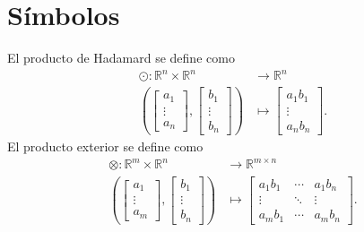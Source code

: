\chapter{Símbolos}

El producto de Hadamard se define como
\begin{align*}
	\odot\colon\mathbb{R}^{n}\times\mathbb{R}^{n} & \longrightarrow\mathbb{R}^{n} \\
	\left(
	\begin{bmatrix}
			a_{1}  \\
			\vdots \\
			a_{n}
		\end{bmatrix},
	\begin{bmatrix}
			b_{1}  \\
			\vdots \\
			b_{n}
		\end{bmatrix}
	\right)                                       & \longmapsto
	\begin{bmatrix}
		a_{1}b_{1} \\
		\vdots     \\
		a_{n}b_{n}
	\end{bmatrix}.
\end{align*}
El producto exterior se define como
\begin{align*}
	\otimes\colon\mathbb{R}^{m}\times\mathbb{R}^{n} & \longrightarrow\mathbb{R}^{m\times n} \\
	\left(
	\begin{bmatrix}
			a_{1}  \\
			\vdots \\
			a_{m}
		\end{bmatrix},
	\begin{bmatrix}
			b_{1}  \\
			\vdots \\
			b_{n}
		\end{bmatrix}
	\right)                                         & \longmapsto
	\begin{bmatrix}
		a_{1}b_{1} & \cdots & a_{1}b_{n} \\
		\vdots     & \ddots & \vdots     \\
		a_{m}b_{1} & \cdots & a_{m}b_{n}
	\end{bmatrix}.
\end{align*}
